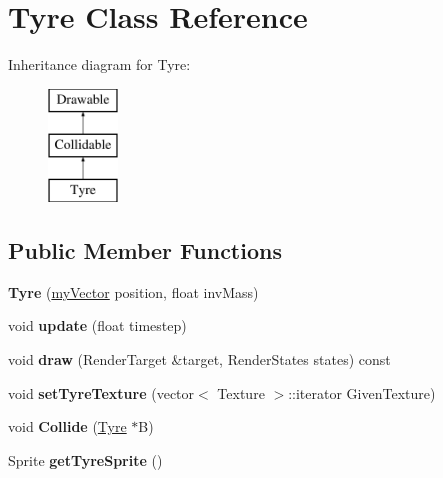 \hypertarget{class_tyre}{}\section{Tyre Class Reference}
\label{class_tyre}
Inheritance diagram for Tyre\+:\begin{figure}[H]
\begin{center}
\leavevmode
\includegraphics[height=3.000000cm]{class_tyre}
\end{center}
\end{figure}
\subsection*{Public Member Functions}
\begin{DoxyCompactItemize}
\item 
\hypertarget{class_tyre_a1908351bf7262df0b42b24f036af21ac}{}{\bfseries Tyre} (\hyperlink{classmy_vector}{my\+Vector} position, float inv\+Mass)\label{class_tyre_a1908351bf7262df0b42b24f036af21ac}

\item 
\hypertarget{class_tyre_abdcd021058ef1c1821f472f79835e4ab}{}void {\bfseries update} (float timestep)\label{class_tyre_abdcd021058ef1c1821f472f79835e4ab}

\item 
\hypertarget{class_tyre_ae42e42ec7c444b97602fc4cda9f83480}{}void {\bfseries draw} (Render\+Target \&target, Render\+States states) const \label{class_tyre_ae42e42ec7c444b97602fc4cda9f83480}

\item 
\hypertarget{class_tyre_ab66f2659c2384b6c608b5eb51bb50425}{}void {\bfseries set\+Tyre\+Texture} (vector$<$ Texture $>$\+::iterator Given\+Texture)\label{class_tyre_ab66f2659c2384b6c608b5eb51bb50425}

\item 
\hypertarget{class_tyre_afc0a9733f7b94042a08be61e25e2d4d3}{}void {\bfseries Collide} (\hyperlink{class_tyre}{Tyre} $\ast$B)\label{class_tyre_afc0a9733f7b94042a08be61e25e2d4d3}

\item 
\hypertarget{class_tyre_a891c2da654fa90ae2f734c5fb5315e45}{}Sprite {\bfseries get\+Tyre\+Sprite} ()\label{class_tyre_a891c2da654fa90ae2f734c5fb5315e45}

\end{DoxyCompactItemize}
